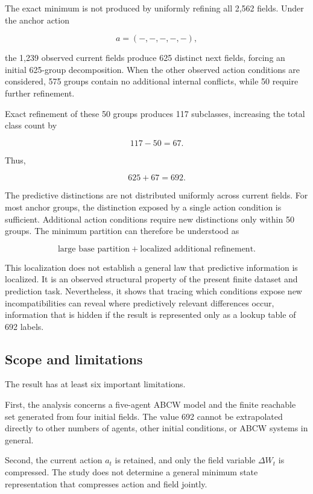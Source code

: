 \documentclass[
  11pt,
]{article}
\begin{document}
The exact minimum is not produced by uniformly refining all 2,562
fields. Under the anchor action

\[{a=(-,-,-,-,-),}\]

the 1,239 observed current fields produce 625 distinct next fields,
forcing an initial 625-group decomposition. When the other observed
action conditions are considered, 575 groups contain no additional
internal conflicts, while 50 require further refinement.

Exact refinement of these 50 groups produces 117 subclasses, increasing
the total class count by

\[{117-50=67.}\]

Thus,

\[{625+67=692.}\]

The predictive distinctions are not distributed uniformly across current
fields. For most anchor groups, the distinction exposed by a single
action condition is sufficient. Additional action conditions require new
distinctions only within 50 groups. The minimum partition can therefore
be understood as

\[{\text{large base partition}+\text{localized additional refinement}.}\]

This localization does not establish a general law that predictive
information is localized. It is an observed structural property of the
present finite dataset and prediction task. Nevertheless, it shows that
tracing which conditions expose new incompatibilities can reveal where
predictively relevant differences occur, information that is hidden if
the result is represented only as a lookup table of 692 labels.

\hypertarget{scope-and-limitations}{%
\subsection{Scope and limitations}\label{scope-and-limitations}}

The result has at least six important limitations.

First, the analysis concerns a five-agent ABCW model and the finite
reachable set generated from four initial fields. The value 692 cannot
be extrapolated directly to other numbers of agents, other initial
conditions, or ABCW systems in general.

Second, the current action \({a_t}\) is retained, and only the field
variable \({\Delta W_t}\) is compressed. The study does not determine a
general minimum state representation that compresses action and field
jointly.
\end{document}
